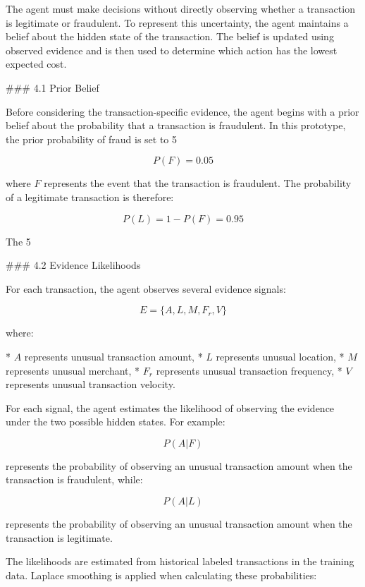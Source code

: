 The agent must make decisions without directly observing whether a transaction is legitimate or fraudulent. To represent this uncertainty, the agent maintains a belief about the hidden state of the transaction. The belief is updated using observed evidence and is then used to determine which action has the lowest expected cost.

### 4.1 Prior Belief

Before considering the transaction-specific evidence, the agent begins with a prior belief about the probability that a transaction is fraudulent. In this prototype, the prior probability of fraud is set to 5%

$$
P(F)=0.05
$$

where \(F\) represents the event that the transaction is fraudulent. The probability of a legitimate transaction is therefore:

$$
P(L)=1-P(F)=0.95
$$

The 5%

### 4.2 Evidence Likelihoods

For each transaction, the agent observes several evidence signals:

$$
E = \{A, L, M, F_r, V\}
$$

where:

* \(A\) represents unusual transaction amount,
* \(L\) represents unusual location,
* \(M\) represents unusual merchant,
* \(F_r\) represents unusual transaction frequency,
* \(V\) represents unusual transaction velocity.

For each signal, the agent estimates the likelihood of observing the evidence under the two possible hidden states. For example:

$$
P(A|F)
$$

represents the probability of observing an unusual transaction amount when the transaction is fraudulent, while:

$$
P(A|L)
$$

represents the probability of observing an unusual transaction amount when the transaction is legitimate.

The likelihoods are estimated from historical labeled transactions in the training data. Laplace smoothing is applied when calculating these probabilities:

